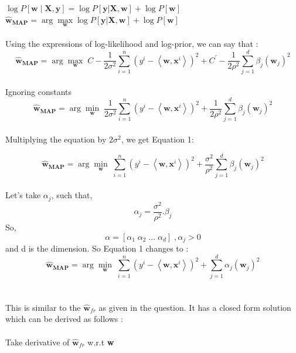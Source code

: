 \documentclass[a4paper,11pt]{article}
\begin{document}
\begin{mlsolution}
\begin{math}
\log P[\textbf{w}\mid\textbf{X},\textbf{y}]  = \log P[\textbf{y}|\textbf{X}, \textbf{w}] + \log P[\textbf{w}]
\end{math}\\

\begin{math}
\widehat{\textbf{w}}_{\textbf{MAP}}  = \arg \underset{\textbf{w}}{\max} \log P[\textbf{y}|\textbf{X}, \textbf{w}] + \log P[\textbf{w}]
\end{math}\\\\
Using the expressions of log-likelihood and log-prior, we can say that :\\

\[
\widehat{\textbf{w}}_{\textbf{MAP}}  = \arg \underset{\textbf{w}}{\max} \;
C - \frac{1}{2\sigma^{2}} \sum_{i = 1}^{n} \left ( y^{i} - \left \langle \textbf{w}, \textbf{x}^{i} \right \rangle \right )^{2} + C^{'} - \frac{1}{2\rho^{2}} \sum_{j = 1}^{d} \beta_{j}\left ( \textbf{w}_{j} \right )^{2}
\]\\
Ignoring constants \\

\[
\widehat{\textbf{w}}_{\textbf{MAP}}  = \arg \underset{\textbf{w}}{\min} \;
\frac{1}{2\sigma^{2}} \sum_{i = 1}^{n} \left ( y^{i} - \left \langle \textbf{w}, \textbf{x}^{i} \right \rangle \right )^{2} + \frac{1}{2\rho^{2}} \sum_{j = 1}^{d} \beta_{j}\left ( \textbf{w}_{j} \right )^{2}
\]\\
Multiplying the equation by \begin{math}2\sigma^{2}\end{math}, we get Equation 1:

\[
\widehat{\textbf{w}}_{\textbf{MAP}}  = \arg \underset{\textbf{w}}{\min} \; \sum_{i = 1}^{n} \left ( y^{i} - \left \langle \textbf{w}, \textbf{x}^{i} \right \rangle \right )^{2} + \frac{\sigma^{2}}{\rho^{2}} \sum_{j = 1}^{d} \beta_{j}\left ( \textbf{w}_{j} \right )^{2}
\]\\
Let's take $\alpha_{j}$, such that, \[ \alpha_{j} = \frac{\sigma^{2}}{\rho^{2}}.\beta_{j}  \]
So, \[ \alpha = \left [ \alpha_{1} \; \alpha_{2}\; ...\; \alpha_{d} \right ]\; , \alpha_{j} > 0\]  and d is the dimension.
So Equation 1 changes to :\\

\[
\widehat{\textbf{w}}_{\textbf{MAP}}  = \arg \underset{\textbf{w}}{\min} \; \sum_{i = 1}^{n} \left ( y^{i} - \left \langle \textbf{w}, \textbf{x}^{i} \right \rangle \right )^{2} + \sum_{j = 1}^{d} \alpha_{j}\left ( \textbf{w}_{j} \right )^{2}
\]\\\\This is similar to the \begin{math}\widehat{\textbf{w}}_{fr}\end{math} as given in the question. It has a closed form solution which can be derived as follows : \\\\Take derivative of \begin{math}\widehat{\textbf{w}}_{fr}\end{math} w.r.t \textbf{w}\\\\


\end{mlsolution}
\end{document}
